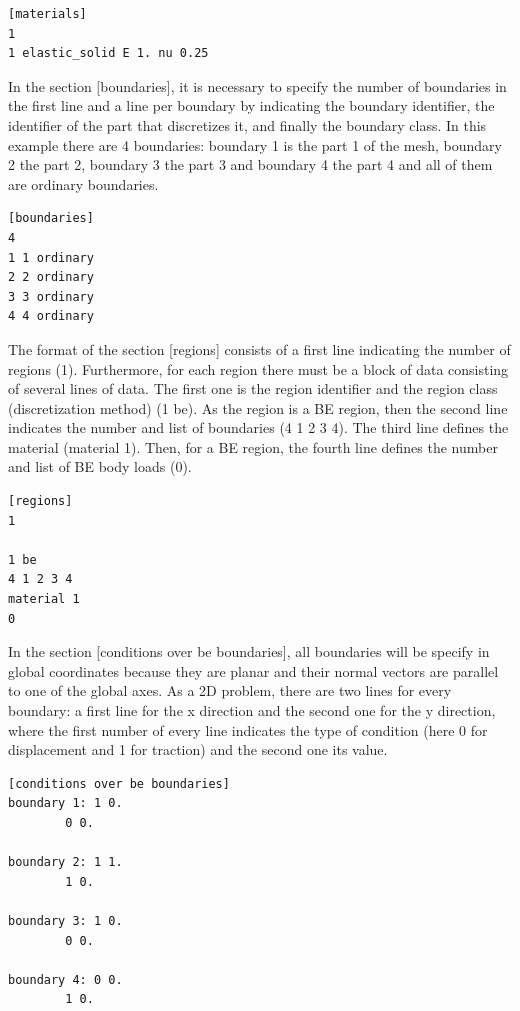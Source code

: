 \documentclass[A4]{article}
\begin{document}
\begin{Verbatim}	
[materials]
1
1 elastic_solid E 1. nu 0.25
\end{Verbatim}

In the section [boundaries], it is necessary to specify the number of boundaries in the first line and a line per boundary by indicating the boundary identifier, the identifier of the part that discretizes it, and finally the boundary class. In this example there are 4 boundaries: boundary 1 is the part 1 of the mesh, boundary 2 the part 2, boundary 3 the part 3 and boundary 4 the part 4 and all of them are ordinary boundaries.

\begin{Verbatim}	
[boundaries]
4
1 1 ordinary
2 2 ordinary
3 3 ordinary
4 4 ordinary
\end{Verbatim}

The format of the section [regions] consists of a first line indicating the number of regions (1). Furthermore, for each region there must be a block of data consisting of several lines of data. The first one is the region identifier and the region class (discretization method) (1 be). As the region is a BE region, then the second line indicates the number  and list of boundaries (4 1 2 3 4). The third line defines the material (material 1). Then, for a BE region, the fourth line defines the number and list of BE body loads (0).

\begin{Verbatim}	
[regions]
1

1 be
4 1 2 3 4
material 1
0
\end{Verbatim}

In the section [conditions over be boundaries], all boundaries will be specify in global coordinates because they are planar and their normal vectors are parallel to one of the global axes. As a 2D problem, there are two lines for every boundary: a first line for the x direction and the second one for the y direction, where the first number of every line indicates the type of condition (here 0 for displacement and 1 for traction) and the second one its value.

\begin{Verbatim}	
[conditions over be boundaries]
boundary 1: 1 0.
    	0 0.

boundary 2: 1 1.
	    1 0.

boundary 3: 1 0.
	    0 0.

boundary 4: 0 0.
	    1 0.
\end{Verbatim}
\end{document}
